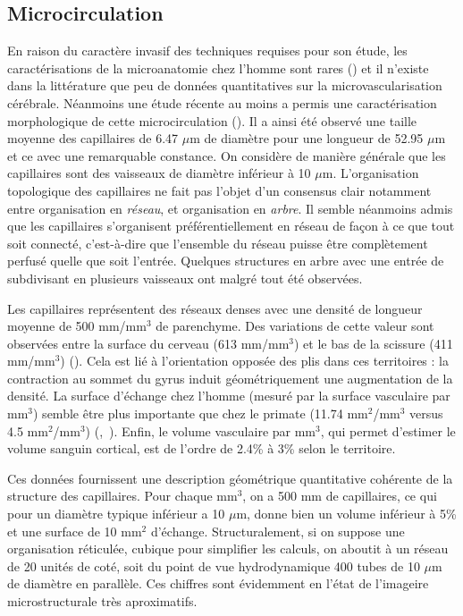 \subsection{Microcirculation}
\label{sect:microcirculation}
En raison du caractère invasif des techniques requises pour son étude, les caractérisations de la microanatomie chez l’homme sont rares (\cite{Brett2002}) et il n’existe dans la littérature que peu de données quantitatives sur la microvascularisation cérébrale. Néanmoins une étude récente au moins a permis une caractérisation morphologique de cette microcirculation (\cite{Lauwers2008}). Il a ainsi été observé une taille moyenne des capillaires de 6.47 $\mu$m de diamètre pour une longueur de 52.95 $\mu$m et ce avec une remarquable constance. On considère de manière générale que les capillaires sont des vaisseaux de diamètre inférieur à 10 $\mu$m. L’organisation topologique des capillaires ne fait pas l’objet d’un consensus clair notamment entre organisation en {\em réseau}, et organisation en {\em arbre}. Il semble néanmoins admis que les capillaires s’organisent préférentiellement en réseau de façon à ce que tout soit connecté, c’est-à-dire que l’ensemble du réseau puisse être complètement perfusé quelle que soit l’entrée. Quelques structures en arbre avec une entrée de subdivisant en plusieurs vaisseaux ont malgré tout été observées.

Les capillaires représentent des réseaux denses avec une densité de longueur moyenne de 500 mm/mm$^3$ de parenchyme. Des variations de cette valeur sont observées entre la surface du cerveau (613 mm/mm$^3$) et le bas de la scissure (411 mm/mm$^3$)  (\cite{Lauwers2008}). Cela est lié à l’orientation opposée des plis dans ces territoires : la contraction au sommet du gyrus induit géométriquement une augmentation de la densité. La surface d’échange chez l’homme (mesuré par la surface vasculaire par mm$^3$) semble être plus importante que chez le primate (11.74 mm$^2$/mm$^3$ versus 4.5 mm$^2$/mm$^3$) (\cite{Lauwers2008},~\cite{Risser2007}). Enfin, le volume vasculaire par mm$^3$, qui permet d’estimer le volume sanguin cortical, est de l’ordre de 2.4\% à 3\% selon le territoire.

Ces données fournissent une description géométrique quantitative cohérente de la structure des capillaires. Pour chaque mm$^3$, on a 500 mm de capillaires, ce qui pour un diamètre typique inférieur a 10 $\mu$m, donne bien un volume inférieur à 5\% et une surface de 10 mm$^2$ d'échange. Structuralement, si on suppose une organisation réticulée, cubique pour simplifier les calculs, on aboutit à un réseau de 20 unités de coté, soit du point de vue hydrodynamique 400 tubes de 10 $\mu$m de diamètre en parallèle. Ces chiffres sont évidemment en l'état de l'imageire  microstructurale très aproximatifs. 

